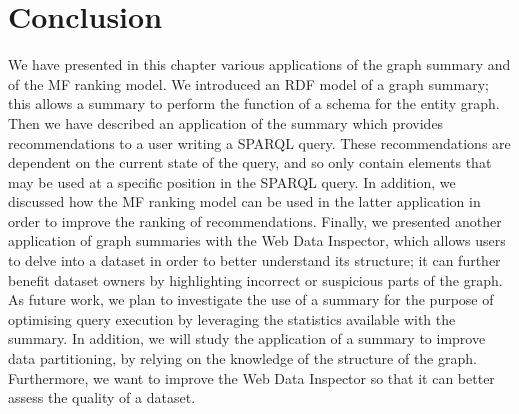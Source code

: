 \section{Conclusion}

We have presented in this chapter various applications of the graph summary and of the MF ranking model. We introduced an RDF model of a graph summary; this allows a summary to perform the function of a schema for the entity graph. Then we have described an application of the summary which provides recommendations to a user writing a SPARQL query. These recommendations are dependent on the current state of the query, and so only contain elements that may be used at a specific position in the SPARQL query. In addition, we discussed how the MF ranking model can be used in the latter application in order to improve the ranking of recommendations. Finally, we presented another application of graph summaries with the Web Data Inspector, which allows users to delve into a dataset in order to better understand its structure; it can further benefit dataset owners by highlighting incorrect or suspicious parts of the graph.\\

As future work, we plan to investigate the use of a summary for the purpose of optimising query execution by leveraging the statistics available with the summary. In addition, we will study the application of a summary to improve data partitioning, by relying on the knowledge of the structure of the graph. Furthermore, we want to improve the Web Data Inspector so that it can better assess the quality of a dataset.
